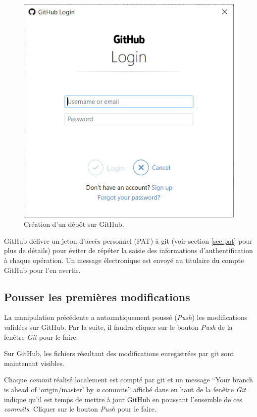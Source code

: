 \documentclass[
  11pt,
  french,
  a4paper,
  extrafontsizes,onecolumn,openright
  ]{memoir}
\begin{document}
\begin{figure}

{\centering \includegraphics[width=0.8\linewidth]{images/git-PAT} 

}

\caption{Création d'un dépôt sur GitHub.}\label{fig:git-PAT}
\end{figure}

\normalsize

GitHub délivre un jeton d'accès personnel (PAT) à git (voir section \ref{sec:pat} pour plus de détails) pour éviter de répéter la saisie des informations d'authentification à chaque opération.
Un message électronique est envoyé au titulaire du compte GitHub pour l'en avertir.

\hypertarget{pousser-les-premiuxe8res-modifications}{%
\subsection{Pousser les premières modifications}\label{pousser-les-premiuxe8res-modifications}}

La manipulation précédente a automatiquement poussé (\emph{Push}) les modifications validées sur GitHub.
Par la suite, il faudra cliquer sur le bouton \emph{Push} de la fenêtre \emph{Git} pour le faire.

Sur GitHub, les fichiers résultant des modifications enregistrées par git sont maintenant visibles.

Chaque \emph{commit} réalisé localement est compté par git et un message ``Your branch is ahead of `origin/master' by \emph{n} commits'' affiché dans en haut de la fenêtre \emph{Git} indique qu'il est temps de mettre à jour GitHub en poussant l'ensemble de ces \emph{commits}.
Cliquer sur le bouton \emph{Push} pour le faire.
\end{document}
